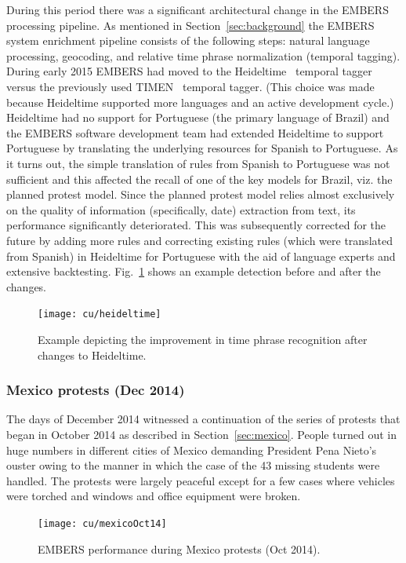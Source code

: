 During this period there was a significant architectural change in the
EMBERS processing pipeline. As mentioned in Section~\ref{sec:background} the
EMBERS system enrichment pipeline consists of the following steps: natural language processing,
geocoding, and relative time phrase normalization (temporal tagging). During early 2015
EMBERS had moved to the Heideltime~\cite{heideltime} temporal
tagger versus the previously used TIMEN~\cite{timen} temporal tagger. (This
choice was made because
Heideltime supported more languages and an active development cycle.)
Heideltime had no support for Portuguese (the primary
language of Brazil) and the EMBERS software development team had 
extended Heideltime to
support Portuguese by translating the underlying
resources for Spanish to Portuguese. As it turns out,
the simple translation of rules from Spanish to Portuguese
was not sufficient and this affected the recall of one of the key models
for Brazil, viz. the planned protest model.
Since the planned protest model relies
almost exclusively on the quality of information (specifically, date) extraction from text,
its performance significantly deteriorated.
This was subsequently corrected for the future by adding
more rules and correcting existing rules (which were translated from
Spanish) in Heideltime for Portuguese with the aid of language experts and
extensive backtesting. Fig.~\ref{fig:heideltime} shows an example
detection before and after the changes.

\begin{figure}
  \centering
\texttt{[image: cu/heideltime]}
\caption{Example depicting the improvement in time phrase
recognition after changes to
Heideltime.}
\label{fig:heideltime}
\end{figure}

\subsubsection{Mexico protests (Dec 2014)}
The days of December 2014 witnessed a continuation of the series of protests that began in October 2014
as described in Section~\ref{sec:mexico}. People turned out in huge numbers in different cities of Mexico demanding
President Pena Nieto's ouster owing to the manner in which the case of the 43 missing students were handled.
The protests were largely peaceful except for a few cases where vehicles were torched and windows and office equipment
were broken.
\begin{figure} %
\centering
\texttt{[image: cu/mexicoOct14]}
\caption{EMBERS performance during Mexico protests (Oct 2014).}
\label{fig:mexicoOct14}
\end{figure}

